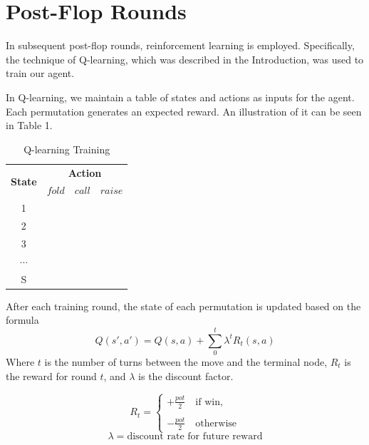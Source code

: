 \documentclass{article}
\begin{document}
\section{Post-Flop Rounds}

In subsequent post-flop rounds, reinforcement learning is employed. Specifically, the technique of Q-learning, which was described in the Introduction, was used to train our agent.

In Q-learning, we maintain a table of states and actions as inputs for the agent. Each permutation generates an expected reward. An illustration of it can be seen in Table 1.

\begin{table}[h!]
  \begin{center}
	\begin{tabular}{ c|c|c|c }
	\hline
	\multirow{2}{*}{\textbf{State}}&\multicolumn{3}{|c}{\textbf{Action}}\\
	\cline{2-4}
	& $fold$ & $call$ & $raise$\\ 
	\hline
	1\\
	2\\ 
	3\\ 
	$\cdots$\\
	S\\
	\hline
	\end{tabular}
	\caption{Q-learning Training}
    \label{tab:table1}
  \end{center}
\end{table}
After each training round, the state of each permutation is updated based on the formula
\begin{displaymath}
Q\left(s',a'\right)=Q\left(s,a\right)+\sum_{0}^{t}\lambda^{t}R_t\left(s,a\right)
\end{displaymath}
Where $t$ is the number of turns between the move and the terminal node, $R_t$ is the reward for round $t$, and $\lambda$ is the discount factor.

\begin{displaymath}
  R_t=
  \left\lbrace
  \begin{array}{l}
    +\frac{pot}{2}\quad\text{if win,} \\
    \\
    -\frac{pot}{2}\quad\text{otherwise}
  \end{array}
  \right.
\end{displaymath}
\begin{displaymath}
  \lambda=\text{discount rate for future reward}
\end{displaymath}
\end{document}
